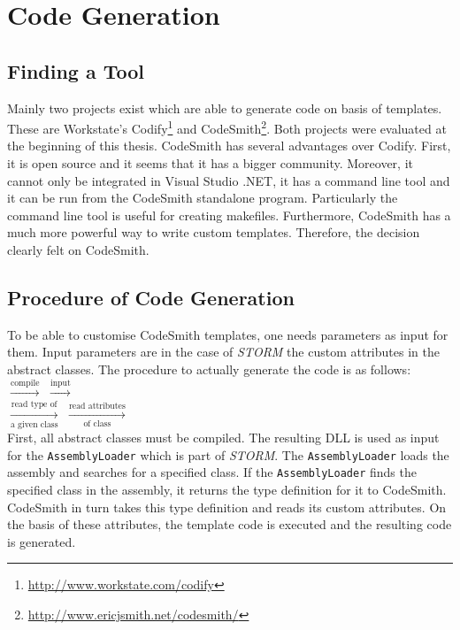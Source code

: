 \chapter{Code Generation}
\label{cha:codeGeneration}

	\section{Finding a Tool}
		Mainly two projects exist which are able to generate code on basis of templates. These are
		Workstate's Codify\footnote{\url{http://www.workstate.com/codify}} and 
		CodeSmith\footnote{\url{http://www.ericjsmith.net/codesmith/}}. Both projects were evaluated
		at the beginning of this thesis. CodeSmith has several advantages over Codify. First, it
		is open source and it seems that it has a bigger community. Moreover, it cannot only be
		integrated in Visual Studio .NET, it has a command line tool and it can be run 
		from the CodeSmith standalone program. Particularly the command line tool is
		useful for creating makefiles. Furthermore, CodeSmith has a much more powerful
		way to write custom templates. Therefore, the decision clearly felt on CodeSmith. 
		
	\section{Procedure of Code Generation}
		To be able to customise CodeSmith templates,
		one needs parameters as input for them. Input parameters are in the case of \textit{STORM} the custom 
		attributes in the abstract classes. The procedure to actually generate the code is as follows:\\[2mm]
		
			\noindent
				$\xrightarrow{\text{compile}}$ 
				$\xrightarrow{\text{input}}$
				\\[2mm]
				$\xrightarrow[\text{a given class}]{\text{read type of}}$
				$\xrightarrow[\text{of class}]{\text{read attributes}}$
				\\[2mm]
				
		\noindent
		First, all abstract classes must be compiled. The resulting DLL is used as input for
		the \verb~AssemblyLoader~ which is part of \textit{STORM}. The \verb~AssemblyLoader~ loads 
		the assembly and searches for a specified class. If the \verb~AssemblyLoader~
		finds the specified class in the assembly, it returns the type definition for it to CodeSmith.
		CodeSmith in turn takes this type definition and reads its custom attributes. On the basis of
		these attributes, the template code is executed and the resulting code is generated.
		
